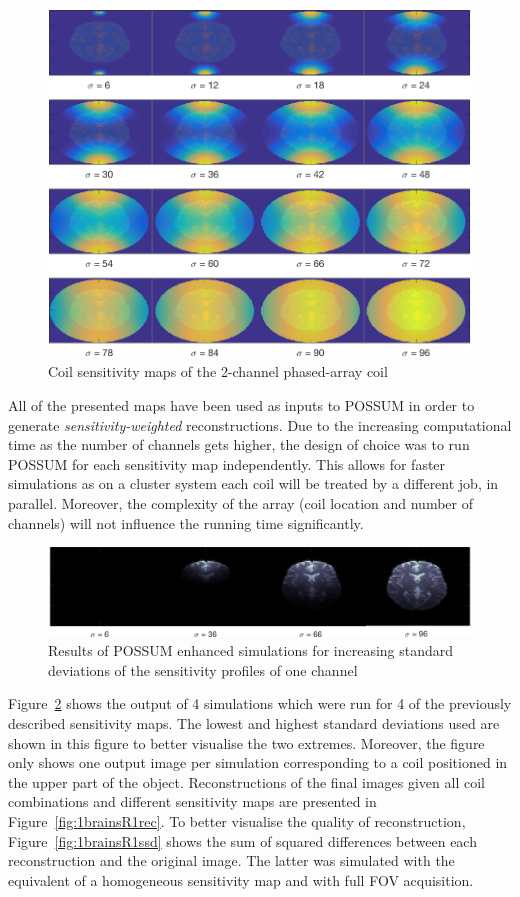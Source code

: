 \begin{figure}[H]
    \centering
    \includegraphics[width=.85\textwidth,keepaspectratio]{2coilsdifsigmas}
    \caption{Coil sensitivity maps of the 2-channel phased-array coil}
    \label{fig:2coilsdifsigmas2}
\end{figure}

All of the presented maps have been used as inputs to POSSUM in order to generate \textit{sensitivity-weighted} reconstructions. Due to the increasing computational time as the number of channels gets higher, the design of choice was to run POSSUM for each sensitivity map independently. This allows for faster simulations as on a cluster system each coil will be treated by a different job, in parallel. Moreover, the complexity of the array (coil location and number of channels) will not influence the running time significantly.

\begin{figure}[H]
    \centering
    \includegraphics[width=1\textwidth,keepaspectratio]{brainsdifsigmas}
    \caption{Results of POSSUM enhanced simulations for increasing standard deviations of the sensitivity profiles of one channel}
    \label{fig:brainsdifsigmas}
\end{figure}

Figure~\ref{fig:brainsdifsigmas} shows the output of 4 simulations which were run for 4 of the previously described sensitivity maps. The lowest and highest standard deviations used are shown in this figure to better visualise the two extremes. Moreover, the figure only shows one output image per simulation corresponding to a coil positioned in the upper part of the object. Reconstructions of the final images given all coil combinations and different sensitivity maps are presented in Figure~\ref{fig:1brainsR1rec}. To better visualise the quality of reconstruction, Figure~\ref{fig:1brainsR1ssd} shows the sum of squared differences between each reconstruction and the original image. The latter was simulated with the equivalent of a homogeneous sensitivity map and with full FOV acquisition.

